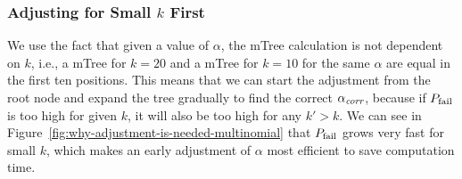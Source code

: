 \subsubsection{Adjusting for Small $k$ First}
We use the fact that given a value of $\alpha$, the mTree calculation is not dependent on $ k $, i.e., a mTree for $k=20$ and a mTree for $k=10$ for the same $\alpha$ are equal in the first ten positions.
%
This means that we can start the adjustment from the root node and expand the tree gradually to find the correct $ \alpha_\textit{corr} $, because if $P_{\operatorname{fail}}$ is too high for given $k$, it will also be too high for any $k' > k$. %
%
%
%
%
%
%
%
We can see in Figure~\ref{fig:why-adjustment-is-needed-multinomial} that $ P_{\operatorname{fail}} $ grows very fast for small $k$, which makes an early adjustment of $\alpha$ most efficient to save computation time.

